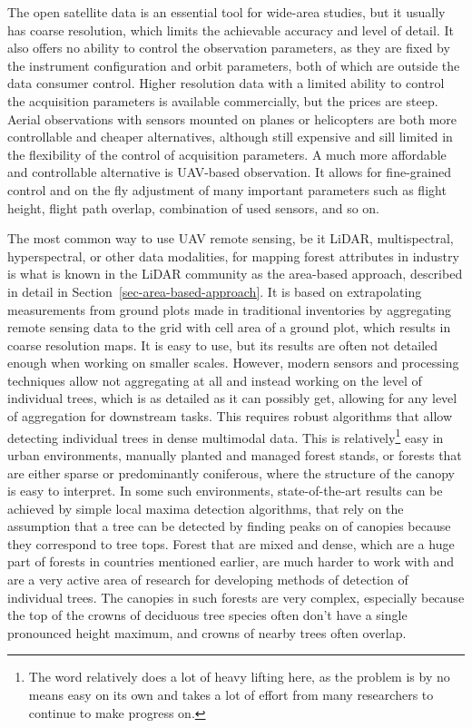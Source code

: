 The open satellite data is an essential tool for wide-area studies, but it usually has coarse resolution, which limits the achievable accuracy and level of detail.
It also offers no ability to control the observation parameters, as they are fixed by the instrument configuration and orbit parameters, both of which are outside the data consumer control.
Higher resolution data with a limited ability to control the acquisition parameters is available commercially, but the prices are steep.
Aerial observations with sensors mounted on planes or helicopters are both more controllable and cheaper alternatives, although still expensive and sill limited in the flexibility of the control of acquisition parameters.
A much more affordable and controllable alternative is UAV-based observation.
It allows for fine-grained control and on the fly adjustment of many important parameters such as flight height, flight path overlap, combination of used sensors, and so on.

The most common way to use UAV remote sensing, be it LiDAR, multispectral, hyperspectral, or other data modalities, for mapping forest attributes in industry is what is known in the LiDAR community as the area-based approach, described in detail in Section~\ref{sec-area-based-approach}.
It is based on extrapolating measurements from ground plots made in traditional inventories by aggregating remote sensing data to the grid with cell area of a ground plot, which results in coarse resolution maps.
It is easy to use, but its results are often not detailed enough when working on smaller scales.
However, modern sensors and processing techniques allow not aggregating at all and instead working on the level of individual trees, which is as detailed as it can possibly get, allowing for any level of aggregation for downstream tasks.
This requires robust algorithms that allow detecting individual trees in dense multimodal data.
This is relatively\footnote{The word relatively does a lot of heavy lifting here, as the problem is by no means easy on its own and takes a lot of effort from many researchers to continue to make progress on.
} easy in urban environments, manually planted and managed forest stands, or forests that are either sparse or predominantly coniferous, where the structure of the canopy is easy to interpret.
In some such environments, state-of-the-art results can be achieved by simple local maxima detection algorithms, that rely on the assumption that a tree can be detected by finding peaks on of canopies because they correspond to tree tops.
Forest that are mixed and dense, which are a huge part of forests in countries mentioned earlier, are much harder to work with and are a very active area of research for developing methods of detection of individual trees.
The canopies in such forests are very complex, especially because the top of the crowns of deciduous tree species often don't have a single pronounced height maximum, and crowns of nearby trees often overlap.

